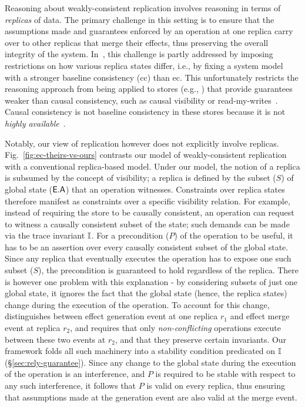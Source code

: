 Reasoning about weakly-consistent replication involves reasoning in
terms of \emph{replicas} of data. The primary challenge in this
setting is to ensure that the assumptions made and guarantees enforced
by an operation at one replica carry over to other replicas that merge
their effects, thus preserving the overall integrity of the system.
In~\cite{gotsmanpopl16}, this challenge is partly addressed by
imposing restrictions on how various replica states differ, i.e., by
fixing a system model with a stronger baseline consistency ({\sc cc})
than {\sc ec}. This unfortunately restricts the reasoning approach
from being applied to stores (e.g., \cite{bayou,pldi15}) that provide
guarantees weaker than causal consistency, such as causal visibility
or read-my-writes~\cite{zoo}. Causal consistency is not baseline
consistency in these stores because it is not \emph{highly
available}~\cite{bailishat}.

Notably, our view of replication however does not explicitly involve
replicas.  Fig.~\ref{fig:ec-theirs-vs-ours} contrasts our model of
weakly-consistent replication with a conventional replica-based
model.  Under our model, the notion of a replica is subsumed by the
concept of visibility; a replica is defined by the subset ($S$) of
global state ($\textsf{E}.\textsf{A}$) that an operation witnesses. Constraints over
replica states therefore manifest as constraints over a specific visibility
relation.  For example, instead of requiring the store to be causally
consistent, an operation can request to witness a causally consistent
subset of the state; such demands can be made via the trace invariant
$\mathbb{I}$. For a precondition ($P$) of the operation to be useful, it has
to be an assertion over every causally consistent subset of the global
state.  Since any replica that eventually executes the operation has
to expose one such subset ($S$), the precondition is guaranteed to
hold regardless of the replica. There is however one problem with this
explanation - by considering subsets of just one global state, it
ignores the fact that the global state (hence, the replica states)
change during the execution of the operation. To account for this
change,~\cite{gotsmanpopl16} distinguishes between effect generation
event at one replica $r_1$ and effect merge event at replica $r_2$,
and requires that only \emph{non-conflicting} operations execute
between these two events at $r_2$, and that they preserve certain
invariants. Our framework folds all such machinery into a stability
condition predicated on $\mathbb{I}$ (\S\ref{sec:rely-guarantee}).  Since any
change to the global state during the execution of the operation is an
interference, and $P$ is required to be stable with respect to any
such interference, it follows that $P$ is valid on every replica, thus
ensuring that assumptions made at the generation event are also valid
at the merge event.

